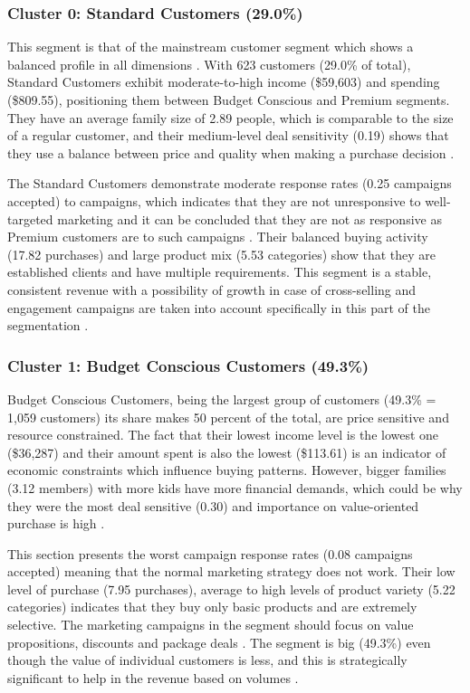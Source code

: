 \documentclass[12pt,a4paper]{report}
\begin{document}
\subsubsection{Cluster 0: Standard Customers (29.0\%)}
\noindent This segment is that of the mainstream customer segment which shows a balanced profile in all dimensions \cite{wedel2000}. With 623 customers (29.0\% of total), Standard Customers exhibit moderate-to-high income (\$59,603) and spending (\$809.55), positioning them between Budget Conscious and Premium segments. They have an average family size of 2.89 people, which is comparable to the size of a regular customer, and their medium-level deal sensitivity (0.19) shows that they use a balance between price and quality when making a purchase decision \cite{kotler2016}.

\noindent The Standard Customers demonstrate moderate response rates (0.25 campaigns accepted) to campaigns, which indicates that they are not unresponsive to well-targeted marketing and it can be concluded that they are not as responsive as Premium customers are to such campaigns \cite{kohavi2009}. Their balanced buying activity (17.82 purchases) and large product mix (5.53 categories) show that they are established clients and have multiple requirements. This segment is a stable, consistent revenue with a possibility of growth in case of cross-selling and engagement campaigns are taken into account specifically in this part of the segmentation \cite{montgomery2004}.


\subsubsection{Cluster 1: Budget Conscious Customers (49.3\%)}
\noindent Budget Conscious Customers, being the largest group of customers (49.3\% = 1,059 customers) its share makes 50 percent of the total, are price sensitive and resource constrained. The fact that their lowest income level is the lowest one (\$36,287) and their amount spent is also the lowest (\$113.61) is an indicator of economic constraints which influence buying patterns. However, bigger families (3.12 members) with more kids have more financial demands, which could be why they were the most deal sensitive (0.30) and importance on value-oriented purchase is high \cite{kotler2016}.


\noindent This section presents the worst campaign response rates (0.08 campaigns accepted) meaning that the normal marketing strategy does not work. Their low level of purchase (7.95 purchases), average to high levels of product variety (5.22 categories) indicates that they buy only basic products and are extremely selective. The marketing campaigns in the segment should focus on value propositions, discounts and package deals \cite{kotler2016}. The segment is big (49.3\%) even though the value of individual customers is less, and this is strategically significant to help in the revenue based on volumes \cite{kumar2006}.
\end{document}
